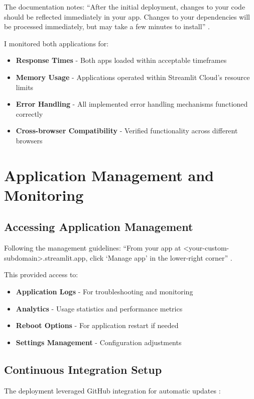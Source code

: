 The documentation notes: ``After the initial deployment, changes to your code should be reflected immediately in your app. Changes to your dependencies will be processed immediately, but may take a few minutes to install'' \cite{Streamlit:2024manage}.

I monitored both applications for:
\begin{itemize}
\item \textbf{Response Times} - Both apps loaded within acceptable timeframes
\item \textbf{Memory Usage} - Applications operated within Streamlit Cloud's resource limits
\item \textbf{Error Handling} - All implemented error handling mechanisms functioned correctly
\item \textbf{Cross-browser Compatibility} - Verified functionality across different browsers
\end{itemize}

\section{Application Management and Monitoring}

\subsection{Accessing Application Management}

Following the management guidelines: ``From your app at \textless{}your-custom-subdomain\textgreater{}.streamlit.app, click `Manage app' in the lower-right corner'' \cite{Streamlit:2024manage}.

This provided access to:
\begin{itemize}
\item \textbf{Application Logs} - For troubleshooting and monitoring
\item \textbf{Analytics} - Usage statistics and performance metrics
\item \textbf{Reboot Options} - For application restart if needed
\item \textbf{Settings Management} - Configuration adjustments
\end{itemize}

\subsection{Continuous Integration Setup}

The deployment leveraged GitHub integration for automatic updates \cite{Streamlit:2024manage}:

